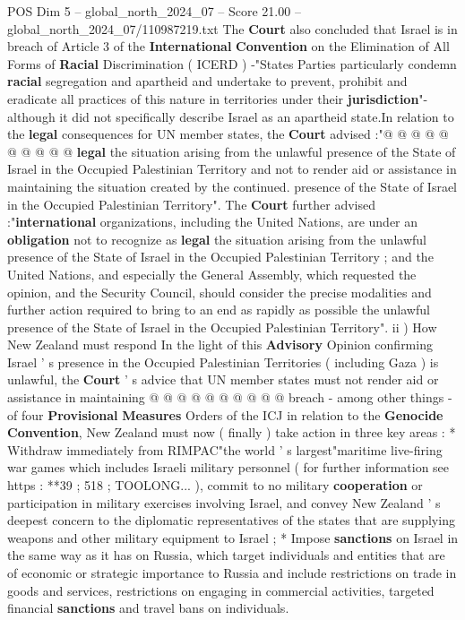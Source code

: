 \begin{textsample}{POS Dim 5 – global\_north\_2024\_07 – Score 21.00 – global\_north\_2024\_07/110987219.txt}
The \textbf{Court} also concluded that Israel is in breach of Article 3 of the \textbf{International} \textbf{Convention} on the Elimination of All Forms of \textbf{Racial} Discrimination ( ICERD ) -"States Parties particularly condemn \textbf{racial} segregation and apartheid and undertake to prevent, prohibit and eradicate all practices of this nature in territories under their \textbf{jurisdiction}"- although it did not specifically describe Israel as an apartheid state.In relation to the \textbf{legal} consequences for UN member states, the \textbf{Court} advised :"@ @ @ @ @ @ @ @ @ @ \textbf{legal} the situation arising from the unlawful presence of the State of Israel in the Occupied Palestinian Territory and not to render aid or assistance in maintaining the situation created by the continued. presence of the State of Israel in the Occupied Palestinian Territory".
The \textbf{Court} further advised :"\textbf{international} organizations, including the United Nations, are under an \textbf{obligation} not to recognize as \textbf{legal} the situation arising from the unlawful presence of the State of Israel in the Occupied Palestinian Territory ; and the United Nations, and especially the General Assembly, which requested the opinion, and the Security Council, should consider the precise modalities and further action required to bring to an end as rapidly as possible the unlawful presence of the State of Israel in the Occupied Palestinian Territory". ii ) How New Zealand must respond In the light of this \textbf{Advisory} Opinion confirming Israel ' s presence in the Occupied Palestinian Territories ( including Gaza ) is unlawful, the \textbf{Court} ' s advice that UN member states must not render aid or assistance in maintaining @ @ @ @ @ @ @ @ @ @ breach - among other things - of four \textbf{Provisional} \textbf{Measures} Orders of the ICJ in relation to the \textbf{Genocide} \textbf{Convention}, New Zealand must now ( finally ) take action in three key areas : * Withdraw immediately from RIMPAC"the world ' s largest"maritime live-firing war games which includes Israeli military personnel ( for further information see https : **39 ; 518 ; TOOLONG... ), commit to no military \textbf{cooperation} or participation in military exercises involving Israel, and convey New Zealand ' s deepest concern to the diplomatic representatives of the states that are supplying weapons and other military equipment to Israel ; * Impose \textbf{sanctions} on Israel in the same way as it has on Russia, which target individuals and entities that are of economic or strategic importance to Russia and include restrictions on trade in goods and services, restrictions on engaging in commercial activities, targeted financial \textbf{sanctions} and travel bans on individuals.

\end{textsample}
